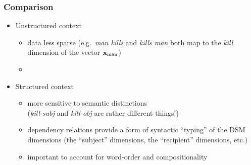 \documentclass[t]{beamer} %
\begin{document}
\begin{frame}
  \frametitle{Comparison}

  \begin{itemize}
  \item Unstructured context
    \begin{itemize}
    \item data less sparse (e.g.\ \emph{man kills} and \emph{kills man} both
      map to the \emph{kill} dimension of the vector $\vx_{\text{man}}$)
    \item[]
    \end{itemize}
  \item Structured context
    \begin{itemize}
    \item more sensitive to semantic distinctions\\
      (\emph{kill-subj} and \emph{kill-obj} are rather different
      things!)
    \item dependency relations provide a form of syntactic ``typing''
      of the DSM dimensions (the ``subject'' dimensions, the
      ``recipient'' dimensions, etc.)
     \item important to account for word-order and compositionality 
    \end{itemize}
  \end{itemize}
\end{frame}

\end{document}
